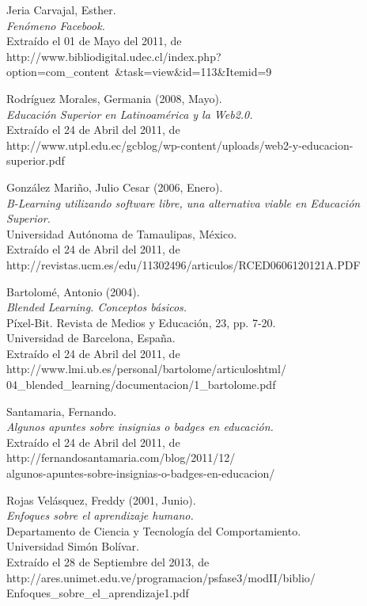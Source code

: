 \begin{thebibliography}{99}

 Jeria Carvajal, Esther.\\
\emph{Fenómeno Facebook.}\\
Extraído el 01 de Mayo del 2011, de\\
http://www.bibliodigital.udec.cl/index.php?option=com\_content\
\&task=view\&id=113\&Itemid=9

 Rodríguez Morales, Germania (2008, Mayo).\\
\emph{Educación Superior en Latinoamérica y la Web2.0.}\\
Extraído el 24 de Abril del 2011, de\\
http://www.utpl.edu.ec/gcblog/wp-content/uploads/web2-y-educacion-superior.pdf

 González Mariño, Julio Cesar (2006, Enero).\\
\emph{B-Learning utilizando software libre, una alternativa viable en
Educación Superior.}\\
Universidad Autónoma de Tamaulipas, México.\\
Extraído el 24 de Abril del 2011, de\\
http://revistas.ucm.es/edu/11302496/articulos/RCED0606120121A.PDF

 Bartolomé, Antonio (2004).\\
\emph{Blended Learning. Conceptos básicos.}\\
Píxel-Bit. Revista de Medios y Educación, 23, pp. 7-20.\\
Universidad de Barcelona, España.\\
Extraído el 24 de Abril del 2011, de\\
http://www.lmi.ub.es/personal/bartolome/articuloshtml/\\
04\_blended\_learning/documentacion/1\_bartolome.pdf

 Santamaria, Fernando.\\
\emph{Algunos apuntes sobre insignias o badges en educación.}\\
Extraído el 24 de Abril del 2011, de\\
http://fernandosantamaria.com/blog/2011/12/\\
algunos-apuntes-sobre-insignias-o-badges-en-educacion/

 Rojas Velásquez, Freddy (2001, Junio).\\
\emph{Enfoques sobre el aprendizaje humano.}\\
Departamento de Ciencia y Tecnología del Comportamiento.\\
Universidad Simón Bolívar.\\
Extraído el 28 de Septiembre del 2013, de\\
http://ares.unimet.edu.ve/programacion/psfase3/modII/biblio/\\
Enfoques\_sobre\_el\_aprendizaje1.pdf


\end{thebibliography}
